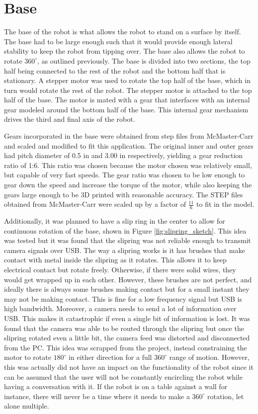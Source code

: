 \section{Base}
The base of the robot is what allows the robot to stand on a surface by itself. The base had to be large enough such that it would provide enough lateral stability to keep the robot from tipping over. The base also allows the robot to rotate $360^\circ$, as outlined previously. The base is divided into two sections, the top half being connected to the rest of the robot and the bottom half that is stationary. A stepper motor was used to rotate the top half of the base, which in turn would rotate the rest of the robot. The stepper motor is attached to the top half of the base. The motor is mated with a gear that interfaces with an internal gear modeled around the bottom half of the base. This internal gear mechanism drives the third and final axis of the robot.

Gears incorporated in the base were obtained from step files from McMaster-Carr \cite{MetalGear20}\cite{MetalInternalGear} and scaled and modified to fit this application. The original inner and outer gears had pitch diameter of 0.5 in and 3.00 in respectively, yielding a gear reduction ratio of 1:6. This ratio was chosen because the motor chosen was relatively small, but capable of very fast speeds. The gear ratio was chosen to be low enough to gear down the speed and increase the torque of the motor, while also keeping the gears large enough to be 3D printed with reasonable accuracy. The STEP files obtained from McMaster-Carr were scaled up by a factor of \(\frac{11}{6}\) to fit in the model.

Additionally, it was planned to have a slip ring in the center to allow for continuous rotation of the base, shown in Figure \ref{fig:slipring_sketch}. This idea was tested but it was found that the slipring was not reliable enough to transmit camera signals over USB. The way a slipring works is it has brushes that make contact with metal inside the slipring as it rotates. This allows it to keep electrical contact but rotate freely. Otherwise, if there were solid wires, they would get wrapped up in each other. However, these brushes are not perfect, and ideally there is always some brushes making contact but for a small instant they may not be making contact. This is fine for a low frequency signal but USB is high bandwidth. Moreover, a camera needs to send a lot of information over USB. This makes it catastrophic if even a single bit of information is lost. It was found that the camera was able to be routed through the slipring but once the slipring rotated even a little bit, the camera feed was distorted and disconnected from the PC. This idea was scrapped from the project, instead constraining the motor to rotate $180^\circ$ in either direction for a full $360^\circ$ range of motion. However, this was actually did not have an impact on the functionality of the robot since it can be assumed that the user will not be constantly encircling the robot while having a conversation with it. If the robot is on a table against a wall for instance, there will never be a time where it needs to make a $360^\circ$ rotation, let alone multiple.

